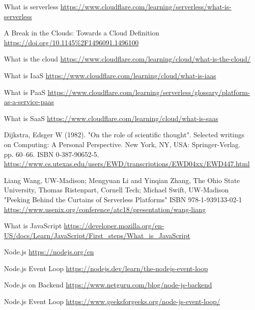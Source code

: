 \begin{thebibliography}{9}

     What is serverless
    \url{https://www.cloudflare.com/learning/serverless/what-is-serverless}

     A Break in the Clouds: Towards a Cloud
    Deﬁnition
    \url{https://doi.org/10.1145%2F1496091.1496100}

     What is the cloud
    \url{https://www.cloudflare.com/learning/cloud/what-is-the-cloud/}

     What is IaaS
    \url{https://www.cloudflare.com/learning/cloud/what-is-iaas}

     What is PaaS
    \url{https://www.cloudflare.com/learning/serverless/glossary/platform-as-a-service-paas}

     What is SaaS
    \url{https://www.cloudflare.com/learning/cloud/what-is-saas}

      Dijkstra, Edsger W (1982).
    "On the role of scientific thought". Selected writings on Computing: A Personal
    Perspective. New York, NY, USA: Springer-Verlag. pp. 60–66. ISBN 0-387-90652-5.
    \url{https://www.cs.utexas.edu/users/EWD/transcriptions/EWD04xx/EWD447.html}

    Liang Wang, UW-Madison; Mengyuan Li and Yinqian Zhang, The Ohio State University,
    Thomas Ristenpart, Cornell Tech; Michael Swift, UW-Madison
    "Peeking Behind the Curtains of Serverless Platforms"
    ISBN 978-1-939133-02-1
    \url{https://www.usenix.org/conference/atc18/presentation/wang-liang}

     What is JavaScript
    \url{https://developer.mozilla.org/en-US/docs/Learn/JavaScript/First_steps/What_is_JavaScript}

     Node.js
    \url{https://nodejs.org/en}

     Node.js Event Loop
    \url{https://nodejs.dev/learn/the-nodejs-event-loop}

     Node.js on Backend
    \url{https://www.netguru.com/blog/node-js-backend}

     Node.js Event Loop
    \url{https://www.geeksforgeeks.org/node-js-event-loop/}


\end{thebibliography}
